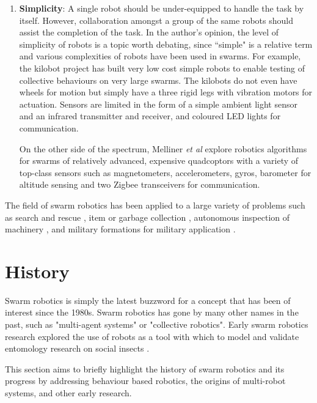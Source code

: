 \begin{enumerate}
\item \textbf{Simplicity}: A single robot should be under-equipped to handle the task by itself. However, collaboration amongst a group of the same robots should assist the completion of the task. In the author's opinion, the level of simplicity of robots is a topic worth debating, since ``simple" is a relative term and various complexities of robots have been used in swarms. For example, the kilobot project \cite{rubenstein2012kilobot} has built very low cost simple robots to enable testing of collective behaviours on very large swarms. The kilobots do not even have wheels for motion but simply have a three rigid legs with vibration motors for actuation. Sensors are limited in the form of a simple ambient light sensor and an infrared transmitter and receiver, and coloured LED lights for communication. 

On the other side of the spectrum, Melliner \textit{et al} \cite{kushleyev2013towards, mellinger2013cooperative} explore robotics algorithms for swarms of relatively advanced, expensive quadcoptors with a variety of top-class sensors such as magnetometers, accelerometers, gyros, barometer for altitude sensing and two Zigbee transceivers for communication.
\end{enumerate}

 The field of swarm robotics has been applied to a large variety of problems such as search and rescue \cite{mondada2002search}, item or garbage collection \cite{balch1995io}, autonomous inspection of machinery \cite{correll2007challenging}, and military formations for military application \cite{balch1998behavior}.



\section{History}
\label{history}
 
Swarm robotics is simply the latest buzzword for a concept that has been of interest since the 1980s. Swarm robotics has gone by many other names in the past, such as "multi-agent systems" or "collective robotics". Early swarm robotics research explored the use of robots as a tool with which to model and validate entomology research on social insects \cite{dorigo2014swarm, beni1993swarm, seeley2009wisdom}.

This section aims to briefly highlight the history of swarm robotics and its progress by addressing behaviour based robotics, the origins of multi-robot systems, and other early research.


